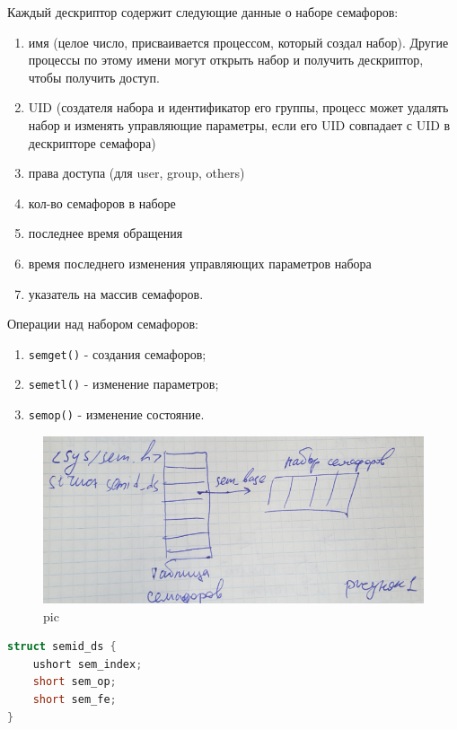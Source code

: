 Каждый дескриптор содержит следующие данные о наборе семафоров: 
\begin{enumerate}
    \item имя (целое число, присваивается процессом, который создал набор). Другие процессы по этому имени могут открыть набор и получить дескриптор, чтобы получить доступ.
    \item UID (создателя набора и идентификатор его группы, процесс может удалять набор и изменять управляющие параметры, если его UID совпадает с UID в дескрипторе семафора)
    \item права доступа (для user, group, others)
    \item кол-во семафоров в наборе
    \item последнее время обращения
    \item время последнего изменения управляющих параметров набора
    \item указатель на массив семафоров.
\end{enumerate} 

Операции над набором семафоров:
\begin{enumerate}
    \item \verb|semget()| - создания семафоров;
    \item \verb|semetl()| - изменение параметров;
    \item \verb|semop()| - изменение состояние.
\end{enumerate} 

\begin{figure}[H]
    \centering
    \includegraphics[width=\textwidth]{pic/3.png}
    \caption{pic}
\end{figure}

\begin{lstlisting}[language=c, caption = Структура $semid\_ds$]
struct semid_ds {
	ushort sem_index;
	short sem_op;
	short sem_fe;
}
\end{lstlisting}

